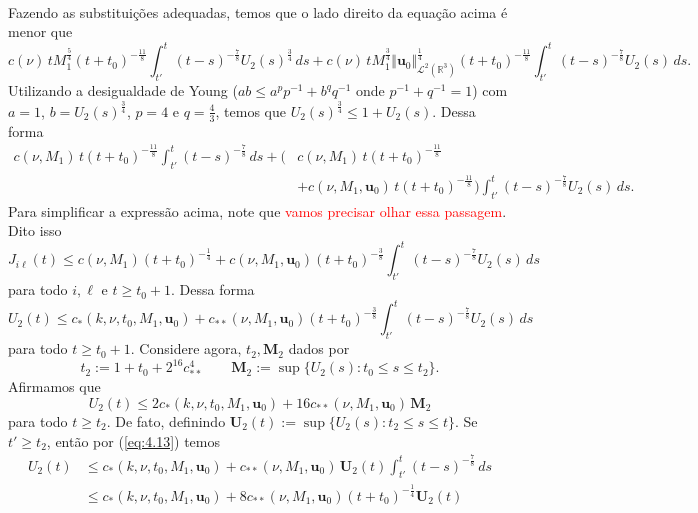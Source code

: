 \documentclass[a4paper, 11pt]{book}
\theoremstyle{definition}
\newcommand{\bR}{\mathbb{R}}
\newcommand{\bu}{\mathbf{u}}
\newcommand{\cL}{\mathcal{L}}
\begin{document}
\begin{prf}
\[\begin{aligned}
        \end{aligned}
    \]
    Fazendo as substituições adequadas, temos que o lado direito da equação acima é menor que
    \[
        c(\nu) \,t M_1^{\frac{5}{4}} (t + t_0)^{-\frac{11}{8}} \int_{t'}^t (t - s)^{-\frac{7}{8}} U_2(s)^{\frac{3}{4}} \,ds + c(\nu) \, t M_1^{\frac{3}{4}} \Vert \bu_0 \Vert^{\frac{1}{4}}_{\cL^2(\bR^3)} (t + t_0)^{-\frac{11}{8}} \int_{t'}^{t} (t - s)^{-\frac{7}{8}} U_2(s) \,ds.
    \]
    Utilizando a desigualdade de Young ($ab \leqslant a^pp^{-1} + b^q q^{-1}$ onde $p^{-1} + q^{-1} = 1$) com $a = 1$, $b = U_2(s)^{\frac{3}{4}}$, $p = 4$ e $q = \frac{4}{3}$, temos que $U_2(s)^{\frac{3}{4}} \leqslant 1 + U_2(s)$.
    Dessa forma
    \[
        \begin{aligned}
            c(\nu, M_1) \,t (t + t_0)^{-\frac{11}{8}} \int_{t'}^t (t - s)^{-\frac{7}{8}} \,ds + \Big( &c(\nu, M_1) \,t (t + t_0)^{-\frac{11}{8}}\\ 
            &+ c(\nu, M_1, \bu_0) \, t (t + t_0)^{-\frac{11}{8}} \Big) \int_{t'}^t (t - s)^{-\frac{7}{8}} U_2(s) \,ds.
        \end{aligned}
    \]
    Para simplificar a expressão acima, note que \textcolor{red}{vamos precisar olhar essa passagem}. Dito isso
    \[
        J_{i\ell}(t) \leqslant c(\nu, M_1) (t + t_0)^{-\frac{1}{4}} + c(\nu,M_1, \bu_0) (t+t_0)^{-\frac{3}{8}} \int_{t'}^t (t - s)^{-\frac{7}{8}} U_2(s)\,ds
    \]
    para todo $i, \ell$ e $t \geqslant t_0 + 1$. Dessa forma
    \begin{equation} \label{eq:4.13}
        U_2(t) \leqslant c_* (k, \nu, t_0, M_1, \bu_0) + c_{**} (\nu, M_1, \bu_0)(t + t_0)^{-\frac{3}{8}} \int_{t'}^t (t-s)^{-\frac{7}{8}} U_2(s) \,ds
    \end{equation}
    para todo $ t \geqslant t_0 + 1$.
    Considere agora, $t_2, \mathbf{M}_2$ dados por
    \[
        t_2 := 1 + t_0 + 2^{16}c_{**}^4 \qquad \mathbf{M}_2 := \sup \{ U_2(s) : t_0 \leqslant  s \leqslant t_2\}.
    \]
    Afirmamos que
    \[
        U_2(t) \leqslant 2 c_* (k,\nu,t_0,M_1,\bu_0) + 16 c_{**}(\nu,M_1,\bu_0) \, \mathbf{M}_2
    \]
    para todo $t\geqslant t_2$.
    De fato, definindo $\mathbf{U}_2(t) := \sup\{ U_2(s): t_2 \leqslant s \leqslant t\}$.
    Se $t' \geqslant t_2$, então por (\ref{eq:4.13}) temos
    \[
        \begin{aligned}
            U_2(t) &\leqslant c_* (k, \nu, t_0, M_1, \bu_0) + c_{**} (\nu,M_1, \bu_0) \, \mathbf{U}_2(t) \int_{t'}^t (t -s)^{-\frac{7}{8}} \,ds\\
            &\leqslant c_* (k, \nu, t_0, M_1, \bu_0) + 8c_{**} (\nu,M_1, \bu_0) (t + t_0)^{-\frac{1}{4}}\mathbf{U}_2(t) 

\end{aligned}\]
\end{prf}
\end{document}
